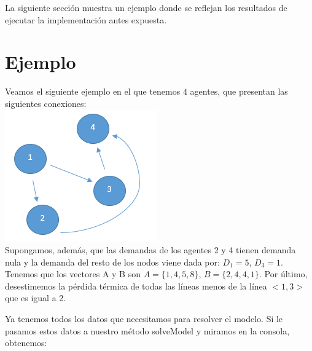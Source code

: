 \documentclass[twoside]{article}
\begin{document}
\begin{multicols}{2}
La siguiente secci\'on muestra un ejemplo donde se reflejan los resultados de ejecutar la implementaci\'on antes expuesta.



\section{Ejemplo}

Veamos el siguiente ejemplo en el que tenemos $4$ agentes, que presentan las siguientes conexiones:\\

\includegraphics{img/pic_1.png} \\

Supongamos, adem\'as, que las demandas de los agentes 2 y 4 tienen demanda nula y la demanda del resto de los nodos viene dada por: $D_1 = 5$, $D_3 = 1$. Tenemos que los vectores A y B son $A = \{1, 4, 5, 8\}$, $B = \{2, 4, 4, 1\}$. Por \'ultimo, desestimemos la p\'erdida t\'ermica de todas las l\'ineas menos de la l\'inea $<1,3>$ que es igual a 2.

Ya tenemos todos los datos que necesitamos para resolver el modelo. Si le pasamos estos datos a nuestro m\'etodo \textsf{solveModel} y miramos en la consola, obtenemos:\\


\end{multicols}
\end{document}
